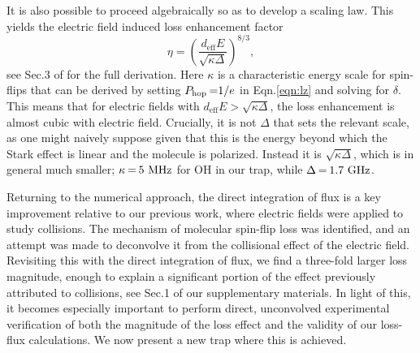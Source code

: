 \documentclass[%
 reprint,
 amsmath,amssymb,
 aps,
prl,
]{revtex4-1}
\newcommand{\epb}{{$\vec{E}\s {\perp}\s\vec{B}$}}
\newcommand{\s}{{\nobreak\hspace{.2em}}}
\begin{document}
It is also possible to proceed algebraically so as to develop a scaling law.
This yields the electric field induced loss enhancement factor
\begin{equation}
\eta= \left(\frac{d_\text{eff}E}{\sqrt{\kappa\Delta}}\right)^{8/3},
\end{equation}
see Sec.\s3 of\s\cite{ssm} for the full derivation. 
Here $\kappa$ is a characteristic energy scale for spin-flips that can be derived by setting $P_\text{hop}\s {=}1/e$ in Eqn.\s\ref{eqn:lz} and solving for $\delta$. 
This means that for electric fields with $d_\text{eff}E>\sqrt{\kappa\Delta}$, the loss enhancement is almost cubic with electric field.
Crucially, it is not $\Delta$ that sets the relevant scale, as one might naively suppose given that this is the energy beyond which the Stark effect is linear and the molecule is polarized.
Instead it is $\sqrt{\kappa\Delta}$, which is in general much smaller; $\kappa\s {=}\s 5\text{ MHz}$ for OH in our trap, while $\Delta\s {=}\s1.7\text{ GHz}$.

Returning to the numerical approach, the direct integration of flux is a key improvement relative to our previous work\s\cite{Stuhl2013}, where electric fields were applied to study collisions.
The mechanism of molecular spin-flip loss was identified, and an attempt was made to deconvolve it from the collisional effect of the electric field. 
Revisiting this with the direct integration of flux, we find a three-fold larger loss magnitude, enough to explain a significant portion of the effect previously attributed to collisions, see Sec.\s1 of our supplementary materials\s\cite{ssm}.
In light of this, it becomes especially important to perform direct, unconvolved experimental verification of both the magnitude of the loss effect and the validity of our loss-flux calculations.
We now present a new trap where this is achieved.
\end{document}
